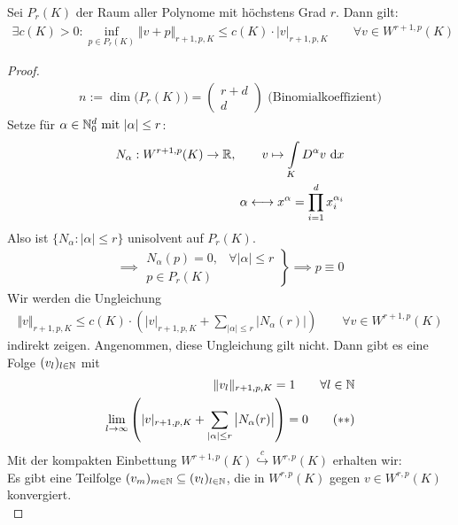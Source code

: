 \begin{lemma}\label{lemma4.11DenyLions}\enter
Sei $P_r(K)$ der Raum aller Polynome mit höchstens Grad $r$. Dann gilt:
\begin{align*}
\exists c(K)>0:\inf\limits_{p\in P_r(K)}\Vert v+p\Vert_{r+1,p,K}\leq c(K)\cdot |v|_{r+1,p,K}\qquad\forall v\in W^{r+1,p}(K)
\end{align*}
\end{lemma}
\begin{proof}
\begin{align*}
n:=\dim \big(P_r(K)\big)=\begin{pmatrix}
r+d\\ d
\end{pmatrix}\text{ (Binomialkoeffizient)}
\end{align*}
Setze  für $\alpha\in\mathbb{N}_0^d\text{ mit }|\alpha|\leq r $:
\begin{align*}
N_\alpha:W^{r+1,p}(K)\to\mathbb{R},\qquad v\mapsto\int\limits_K D^\alpha v\text{ d} x\\
\alpha\longleftrightarrow x^\alpha =\prod\limits_{i=1}^d x_i^{\alpha_i}
\end{align*}
Also ist $\big\lbrace N_\alpha:|\alpha|\leq r\big\rbrace$ unisolvent auf $P_r(K)$.
\begin{align*}
\implies\left.
	\begin{array}{cl}
	N_\alpha(p)=0, &\forall |\alpha|\leq r \\
	p\in P_r(K)&
	\end{array}
\right\rbrace
\implies p\equiv 0
\end{align*}
Wir werden die Ungleichung
\begin{align}\label{eqProof4.11Stern}\tag{$\ast$}
\Vert v\Vert_{r+1,p,K}\leq c(K)\cdot\left(|v|_{r+1,p,K}+\sum\limits_{|\alpha|\leq r}\big|N_\alpha (r)\big|\right)\qquad\forall v\in W^{r+1,p}(K)
\end{align}
indirekt zeigen. Angenommen, diese Ungleichung gilt nicht. Dann gibt es eine Folge $(v_l)_{l\in\mathbb{N}}$ mit 
\begin{align}
\Vert v_l\Vert_{r+1,p,K}=1\qquad\forall l\in\mathbb{N}\nonumber\\
\lim\limits_{l\to\infty} \left(|v|_{r+1,p,K}+\sum\limits_{|\alpha|\leq r}\big|N_\alpha (r)\big|\right)=0\label{eqProof4.11SternStern}\tag{$\ast\ast$}
\end{align}
Mit der kompakten Einbettung $W^{r+1,p}(K)\stackrel{c}{\hookrightarrow} W^{r,p}(K)$ erhalten wir:\\
Es gibt eine Teilfolge $(v_m)_{m\in\mathbb{N}}\subseteq(v_l)_{l\in\mathbb{N}}$, die in $W^{r,p}(K)$ gegen $v\in W^{r,p}(K)$ konvergiert.\\

\end{proof}
